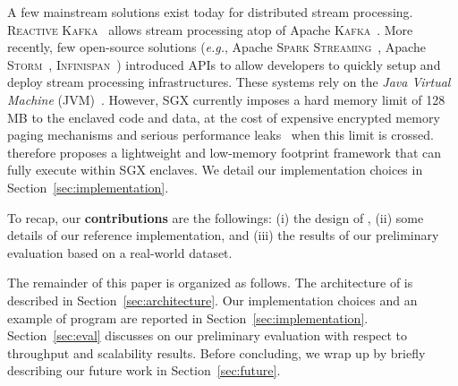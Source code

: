 A few mainstream solutions exist today for distributed stream processing.
\textsc{Reactive Kafka}~\cite{reactivekafka} allows stream processing atop of Apache \textsc{Kafka}~\cite{apachekafka}.
More recently, few open-source solutions (\emph{e.g.}, Apache \textsc{Spark Streaming}~\cite{apachesparkstreaming}, Apache \textsc{Storm}~\cite{apachestorm}, \textsc{Infinispan}~\cite{infinispan}) introduced APIs to allow developers to quickly setup and deploy stream processing infrastructures.
These systems rely on the \emph{Java Virtual Machine} (JVM)~\cite{lindholm2014java}.
However, SGX currently imposes a hard memory limit of 128\,MB to the enclaved code and data, at the cost of expensive encrypted memory paging mechanisms and serious performance leaks~\cite{pires_scbr:2016,brenner_securekeeper:_2016} when this limit is crossed.
\SYS{} therefore proposes a lightweight and low-memory footprint framework that can fully execute within SGX enclaves.
We detail our implementation choices in Section~\ref{sec:implementation}.

To recap, our \textbf{contributions} are the followings: (i) the design of \SYS{}, (ii) some details of our reference implementation, and (iii) the results of our preliminary evaluation based on a real-world dataset.

The remainder of this paper is organized as follows.
The architecture of \SYS{} is described in Section~\ref{sec:architecture}.
Our implementation choices and an example of \SYS{} program are reported in Section~\ref{sec:implementation}.
Section~\ref{sec:eval} discusses on our preliminary evaluation with respect to throughput and scalability results.
Before concluding, we wrap up by briefly describing our future work in Section~\ref{sec:future}.
